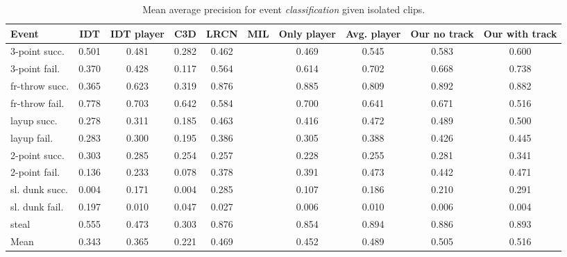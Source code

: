 \begin{table}[t!]
\begin{center}
\small
 \begin{tabular}{|l|c|c|c|c|c|c|c|c|c|}
  \hline
Event & IDT\cite{Wang_CVPR11} & IDT\cite{Wang_CVPR11} player & C3D \cite{Tran_arxiv14} & LRCN \cite{Donahue_arxiv14} & MIL\cite{} & Only player & Avg. player & Our no track & Our with track \\ \hline \hline

3-point succ.    & 0.501 & 0.481 & 0.282 & 0.462 &  & 0.469 & 0.545 & 0.583 & 0.600 \\
3-point fail.    & 0.370 &  0.428& 0.117 & 0.564 &  & 0.614 & 0.702 & 0.668 & 0.738 \\
fr-throw succ. & 0.365 &  0.623& 0.319 & 0.876 &  & 0.885 & 0.809 & 0.892 & 0.882 \\
fr-throw fail. & 0.778 &  0.703& 0.642 & 0.584 &  & 0.700 & 0.641 & 0.671 & 0.516 \\
layup succ.      & 0.278 & 0.311 & 0.185 & 0.463 &  & 0.416 & 0.472 & 0.489 & 0.500 \\
layup fail.      & 0.283 &0.300  & 0.195 & 0.386 &  & 0.305 & 0.388 & 0.426 & 0.445 \\
2-point succ.    & 0.303 &  0.285 & 0.254 & 0.257 &  & 0.228 & 0.255 & 0.281 & 0.341 \\
2-point fail.    & 0.136 &  0.233 & 0.078 & 0.378 &  & 0.391 & 0.473 & 0.442 & 0.471 \\
sl. dunk succ.  & 0.004 &  0.171 & 0.004 & 0.285 &  & 0.107 & 0.186 & 0.210 & 0.291 \\
sl. dunk fail.  & 0.197 &  0.010& 0.047 & 0.027 &  & 0.006 & 0.010 & 0.006 & 0.004 \\
steal            & 0.555 &  0.473& 0.303 & 0.876 &  & 0.854 & 0.894 & 0.886 & 0.893 \\ \hline \hline
Mean             & 0.343 &  0.365 & 0.221 & 0.469 &  & 0.452 & 0.489 & 0.505 & 0.516 \\ \hline
  \end{tabular}
\end{center}
  \caption{Mean average precision for event {\em classification} given
    isolated clips.}
  \label{tab:event_class}
  \label{tab:class_res}
\end{table}

